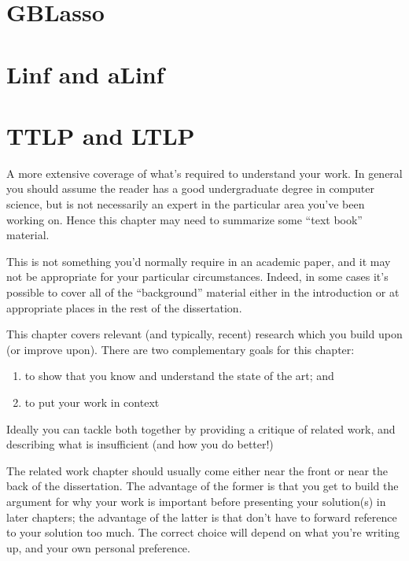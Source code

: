 \section{GBLasso}

\section{Linf and aLinf}

\section{TTLP and LTLP}

\newpage

A more extensive coverage of what's required to understand your 
work. In general you should assume the reader has a good undergraduate 
degree in computer science, but is not necessarily an expert in 
the particular area you've been working on. Hence this chapter 
may need to summarize some ``text book'' material. 

This is not something you'd normally require in an academic paper, 
and it may not be appropriate for your particular circumstances. 
Indeed, in some cases it's possible to cover all of the ``background'' 
material either in the introduction or at appropriate places in 
the rest of the dissertation. 

\newpage

This chapter covers relevant (and typically, recent) research 
which you build upon (or improve upon). There are two complementary 
goals for this chapter: 
\begin{enumerate} 
  \item to show that you know and understand the state of the art; and 
  \item to put your work in context
\end{enumerate} 

Ideally you can tackle both together by providing a critique of
related work, and describing what is insufficient (and how you do
better!)

The related work chapter should usually come either near the front or
near the back of the dissertation. The advantage of the former is that
you get to build the argument for why your work is important before
presenting your solution(s) in later chapters; the advantage of the
latter is that don't have to forward reference to your solution too
much. The correct choice will depend on what you're writing up, and
your own personal preference.